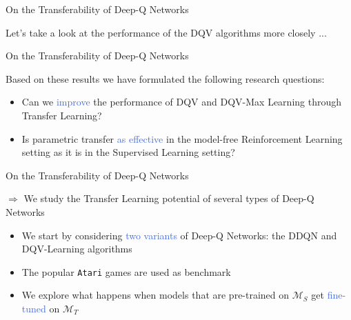 \documentclass{beamer}
\begin{document}
\begin{frame}{On the Transferability of Deep-Q Networks}
	
	Let's take a look at the performance of the DQV algorithms more closely ...
	
	\bigskip
	

\end{frame}


\begin{frame}{On the Transferability of Deep-Q Networks}

	Based on these results we have formulated the following research questions:

	\begin{itemize}
		\item Can we \textcolor{RoyalBlue}{improve} the performance of DQV and DQV-Max Learning through Transfer Learning?
		\item Is parametric transfer \textcolor{RoyalBlue}{as effective} in the model-free Reinforcement Learning setting as it is in the Supervised Learning setting?
	\end{itemize}
	
\end{frame}

\begin{frame}{On the Transferability of Deep-Q Networks}

	$\Rightarrow$ We study the Transfer Learning potential of several types of Deep-Q Networks
	
	\bigskip
	\begin{itemize}
		\item We start by considering \textcolor{RoyalBlue}{two variants} of Deep-Q Networks: the DDQN and DQV-Learning algorithms
		\item The popular \texttt{Atari} games are used as benchmark
		\item We explore what happens when models that are pre-trained on $\mathcal{M}_S$ get \textcolor{RoyalBlue}{fine-tuned} on $\mathcal{M}_T$
	\end{itemize}

\end{frame}
\end{document}
